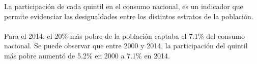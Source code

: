 La participación de cada quintil en el consumo nacional, es un indicador que permite evidenciar las  desigualdades entre los distintos estratos de la población. \\\\ 
Para el 2014, el 20\% más  pobre de la población captaba el 7.1\% del consumo nacional. Se puede observar que entre 2000 y 2014, la participación del quintil más pobre aumentó de 5.2\% en 2000 a 7.1\%  en 2014.